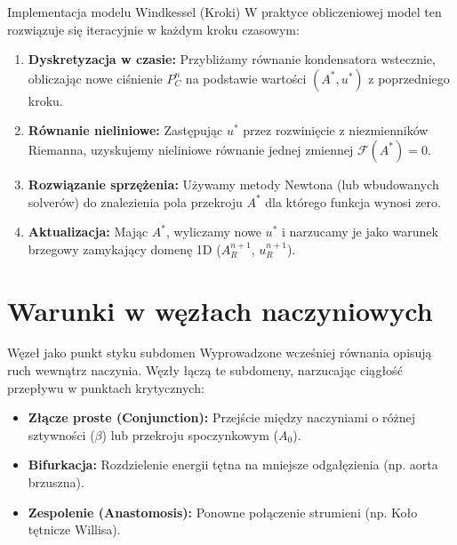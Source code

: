 \documentclass[aspectratio=169]{beamer}
\begin{document}
\begin{frame}{Implementacja modelu Windkessel (Kroki)}
    W praktyce obliczeniowej model ten rozwiązuje się iteracyjnie w każdym kroku czasowym:
    
    \begin{enumerate}
        \item \textbf{Dyskretyzacja w czasie:} Przybliżamy równanie kondensatora wstecznie, obliczając nowe ciśnienie $P_C^n$ na podstawie wartości $(A^*, u^*)$ z poprzedniego kroku.
        \item \textbf{Równanie nieliniowe:} Zastępując $u^*$ przez rozwinięcie z niezmienników Riemanna, uzyskujemy nieliniowe równanie jednej zmiennej $\mathcal{F}(A^*) = 0$.
        \item \textbf{Rozwiązanie sprzężenia:} Używamy metody Newtona (lub wbudowanych solverów) do znalezienia pola przekroju $A^*$ dla którego funkcja wynosi zero.
        \item \textbf{Aktualizacja:} Mając $A^*$, wyliczamy nowe $u^*$ i narzucamy je jako warunek brzegowy zamykający domenę 1D ($A^{n+1}_R$, $u^{n+1}_R$).
    \end{enumerate}
\end{frame}

\section{Warunki w węzłach naczyniowych}

\begin{frame}{Węzeł jako punkt styku subdomen}
    Wyprowadzone wcześniej równania opisują ruch wewnątrz naczynia. Węzły łączą te subdomeny, narzucając ciągłość przepływu w punktach krytycznych:
    \vspace{0.4cm}
    \begin{itemize}
        \item \textbf{Złącze proste (Conjunction):} Przejście między naczyniami o różnej sztywności ($\beta$) lub przekroju spoczynkowym ($A_0$).
        \item \textbf{Bifurkacja:} Rozdzielenie energii tętna na mniejsze odgałęzienia (np. aorta brzuszna).
        \item \textbf{Zespolenie (Anastomosis):} Ponowne połączenie strumieni (np. Koło tętnicze Willisa).
    \end{itemize}
\end{frame}
\end{document}
